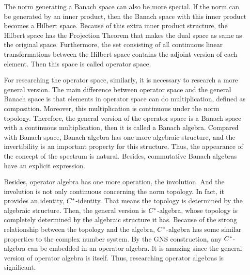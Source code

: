 The norm generating a Banach space can also be more special. If the norm can be generated by an inner product, then the Banach space with this inner product becomes a Hilbert space. Because of this extra inner product structure, the Hilbert space has the Projection Theorem that makes the dual space as same as the original space. Furthermore, the set consisting of all continuous linear transformations between the Hilbert space contains the adjoint version of each element. Then this space is called operator space.

For researching the operator space, similarly, it is necessary to research a more general version. The main difference between operator space and the general Banach space is that elements in operator space can do multiplication, defined as composition. Moreover, this multiplication is continuous under the norm topology. Therefore, the general version of the operator space is a Banach space with a continuous multiplication, then it is called a Banach algebra. Compared with Banach space, Banach algebra has one more algebraic structure, and the invertibility is an important property for this structure. Thus, the appearance of the concept of the spectrum is natural. Besides, commutative Banach algebras have an explicit expression.

Besides, operator algebra has one more operation, the involution. And the involution is not only continuous concerning the norm topology. In fact, it provides an identity, $C^{*}$-identity. That means the topology is determined by the algebraic structure. Then, the general version is $C^{*}$-algebra, whose topology is completely determined by the algebraic structure it has. Because of the strong relationship between the topology and the algebra, $C^{*}$-algebra has some similar properties to the complex number system. By the GNS construction, any $C^{*}$-algebra can be embedded in an operator algebra. It is amazing since the general version of operator algebra is itself. Thus, researching operator algebras is significant.

